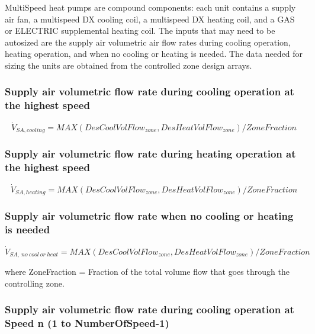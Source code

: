 MultiSpeed heat pumps are compound components: each unit contains a supply air fan, a multispeed DX cooling coil, a multispeed DX heating coil, and a GAS or ELECTRIC supplemental heating coil. The inputs that may need to be autosized are the supply air volumetric air flow rates during cooling operation, heating operation, and when no cooling or heating is needed. The data needed for sizing the units are obtained from the controlled zone design arrays.

\subsubsection{Supply air volumetric flow rate during cooling operation at the highest speed}\label{supply-air-volumetric-flow-rate-during-cooling-operation-at-the-highest-speed}

\begin{equation}
\dot V_{SA,cooling} = MAX(DesCoolVolFlow_{zone},DesHeatVolFlow_{zone})/ZoneFraction
\end{equation}

\subsubsection{Supply air volumetric flow rate during heating operation at the highest speed}\label{supply-air-volumetric-flow-rate-during-heating-operation-at-the-highest-speed}

\begin{equation}
\dot V_{SA,heating} = MAX(DesCoolVolFlow_{zone},DesHeatVolFlow_{zone})/ZoneFraction
\end{equation}

\subsubsection{Supply air volumetric flow rate when no cooling or heating is needed}\label{supply-air-volumetric-flow-rate-when-no-cooling-or-heating-is-needed-1}

\begin{equation}
\dot V_{SA,~no~cool~or~heat} = MAX(DesCoolVolFlow_{zone},DesHeatVolFlow_{zone})/ZoneFraction
\end{equation}

where ZoneFraction = Fraction of the total volume flow that goes through the controlling zone.

\subsubsection{Supply air volumetric flow rate during cooling operation at Speed n (1 to NumberOfSpeed-1)}\label{supply-air-volumetric-flow-rate-during-cooling-operation-at-speed-n-1-to-numberofspeed-1}


